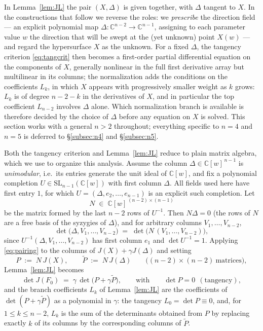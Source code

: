 \documentclass[11pt]{article}
\numberwithin{equation}{section}
\theoremstyle{plain}
\theoremstyle{definition}
\theoremstyle{remark}
\newcommand{\C}{\mathbb{C}}
\begin{document}
In Lemma~\ref{lem:JL} the pair $(X,\Delta)$ is given together, with $\Delta$
tangent to $X$. In the constructions that follow we reverse the roles: we
\emph{prescribe} the direction field --- an explicit polynomial map
$\Delta\colon\C^{n-2}\to\C^{n-1}$, assigning to each parameter value $w$ the
direction that will be swept at the (yet unknown) point $X(w)$ --- and regard
the hypersurface $X$ as the unknown. For a fixed $\Delta$, the tangency
criterion \eqref{eq:tangcrit} then becomes a first-order partial differential
equation on the components of $X$, generally nonlinear in the full first
derivative array but multilinear in its columns; the normalization
adds the conditions on the coefficients $L_k$, in which $X$ appears with
progressively smaller weight as $k$ grows: $L_k$ is of degree $n-2-k$ in the
derivatives of $X$, and in particular the top coefficient $L_{n-2}$ involves
$\Delta$ alone. Which normalization branch is available is therefore decided by
the choice of $\Delta$ before any equation on $X$ is solved. This section works
with a general $n>2$ throughout; everything specific to $n=4$ and $n=5$ is
deferred to \S\ref{subsec:n4} and \S\ref{subsec:n5}.

Both the tangency criterion and Lemma~\ref{lem:JL} reduce to plain matrix
algebra, which we use to organize this analysis. Assume the column
$\Delta\in\C[w]^{\,n-1}$ is \emph{unimodular}, i.e.\ its entries generate the
unit ideal of $\C[w]$, and fix a polynomial completion
$U\in\mathrm{SL}_{n-1}(\C[w])$ with first column $\Delta$.
All fields used here have first entry $1$, for which
$U=(\Delta,e_2,\ldots,e_{n-1})$ is an explicit such completion. Let
\[
N\;\in\;\C[w]^{\,(n-2)\times(n-1)}
\]
be the matrix formed by the last $n-2$ rows of $U^{-1}$. Then $N\Delta=0$ (the
rows of $N$ are a free basis of the syzygies of $\Delta$), and for arbitrary
columns $V_1,\dots,V_{n-2}$,
\begin{equation}\label{eq:pairing}
\det\bigl(\Delta,V_1,\dots,V_{n-2}\bigr)
\;=\;\det\bigl(N\,(V_1,\dots,V_{n-2})\bigr),
\end{equation}
since $U^{-1}(\Delta,V_1,\dots,V_{n-2})$ has first column $e_1$ and
$\det U^{-1}=1$. Applying \eqref{eq:pairing} to the columns of
$J(X)+\gamma J(\Delta)$ and setting
\[
P\;:=\;N\,J(X),\qquad
\widetilde P\;:=\;N\,J(\Delta)
\qquad\bigl((n-2)\times(n-2)\ \text{matrices}\bigr),
\]
Lemma~\ref{lem:JL} becomes
\begin{equation}\label{eq:wedge}
\det J(F_0)\;=\;\gamma\,\det\bigl(P+\gamma\widetilde P\bigr),
\qquad\text{with}\qquad
\det P=0\ \ (\text{tangency}),
\end{equation}
and the branch coefficients $L_k$ of Lemma~\ref{lem:JL} are the coefficients of
$\det(P+\gamma\widetilde P)$ as a polynomial in $\gamma$: the tangency
$L_0=\det P\equiv0$, and, for $1\le k\le n-2$, $L_k$ is the sum of the
determinants obtained from $P$ by replacing exactly $k$ of its columns by the
corresponding columns of $\widetilde P$.
\end{document}
